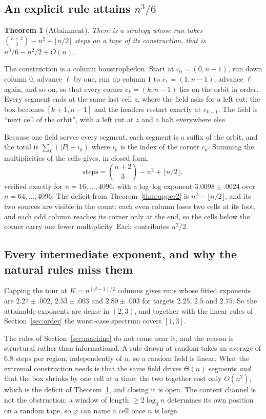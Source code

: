 \documentclass[11pt]{article}
\newtheorem{theorem}{Theorem}
\begin{document}
\subsection{An explicit rule attains $n^3/6$}

\begin{theorem}[Attainment]\label{thm:attain}
There is a strategy whose run takes $\binom{n+2}{3}-n^2+\lfloor n/2\rfloor$ steps on a tape
of its construction, that is $n^3/6-n^2/2+O(n)$.
\end{theorem}

The construction is a column boustrophedon. Start at $c_0=(0,n-1)$, run down column $0$,
advance $\ell$ by one, run up column $1$ to $c_1=(1,n-1)$, advance $\ell$ again, and so on,
so that every corner $c_k=(k,n-1)$ lies on the orbit in order. Every segment ends at the
same last cell $z$, where the field asks for a left cut; the box becomes $[k+1,n-1]$ and the
headers restart exactly at $c_{k+1}$. The field is ``next cell of the orbit'', with a left
cut at $z$ and a halt everywhere else.

Because one field serves every segment, each segment is a suffix of the orbit, and the total
is $\sum_k(|P|-i_k)$ where $i_k$ is the index of the corner $c_k$. Summing the
multiplicities of the cells gives, in closed form,
\[
\text{steps}=\binom{n+2}{3}-n^2+\lfloor n/2\rfloor ,
\]
verified exactly for $n=16,\dots,4096$, with a log--log exponent $3.0098\pm.0024$ over
$n=64,\dots,4096$. The deficit from Theorem~\ref{thm:upper2} is $n^2-\lfloor n/2\rfloor$, and
its two sources are visible in the count: each even column loses two cells at its foot, and
each odd column reaches its corner only at the end, so the cells below the corner carry one
fewer multiplicity. Each contributes $n^2/2$.

\subsection{Every intermediate exponent, and why the natural rules miss them}

Capping the tour at $K=n^{(\beta-1)/2}$ columns gives runs whose fitted exponents are
$2.27\pm.002$, $2.53\pm.003$ and $2.80\pm.003$ for targets $2.25$, $2.5$ and $2.75$. So the
attainable exponents are dense in $(2,3)$, and together with the linear rules of
Section~\ref{sec:order} the worst-case spectrum covers $[1,3]$.

The rules of Section~\ref{sec:machine} do not come near it, and the reason is structural
rather than informational. A rule drawn at random takes an average of $6.8$ steps per
region, independently of $n$, so a random field is linear. What the extremal construction
needs is that the same field drives $\Theta(n)$ segments \emph{and} that the box shrinks by
one cell at a time; the two together cost only $O(n^2)$, which is the deficit of
Theorem~\ref{thm:attain}, and closing it is open. The content channel is not the
obstruction: a window of length $\ge 2\log_3 n$ determines its own position on a random
tape, so $\varphi$ can name a cell once $n$ is large.
\end{document}
